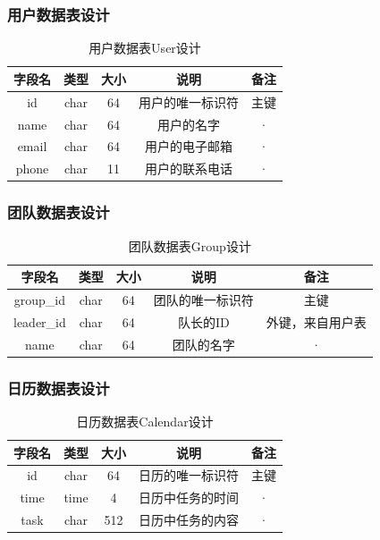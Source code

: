 \subsubsection{用户数据表设计}
\begin{table}[htbp]
\centering
\caption{用户数据表User设计} \label{tab:client-database}
\begin{tabular}{|c|c|c|c|c|}
    \hline
    字段名 & 类型 & 大小 & 说明 & 备注 \\
    \hline
    id & char & 64 & 用户的唯一标识符 & 主键\\
    \hline
    name & char & 64 & 用户的名字 & · \\
    \hline
    email & char  & 64 & 用户的电子邮箱 & · \\
    \hline
    phone & char & 11 & 用户的联系电话 & · \\
    \hline
\end{tabular}
\end{table}
\subsubsection{团队数据表设计}
\begin{table}[htbp]
\centering
\caption{团队数据表Group设计} \label{tab:order-database}
\begin{tabular}{|c|c|c|c|c|}
    \hline
    字段名 & 类型 & 大小 & 说明 & 备注 \\
    \hline
    group\_id & char & 64 & 团队的唯一标识符 & 主键\\
    \hline
    leader\_id & char & 64 & 队长的ID & 外键，来自用户表 \\
    \hline
    name & char & 64 & 团队的名字 & · \\
    \hline
\end{tabular}
\end{table}
\subsubsection{日历数据表设计}
\begin{table}[htbp]
\centering
\caption{日历数据表Calendar设计} \label{tab:order-database}
\begin{tabular}{|c|c|c|c|c|}
    \hline
    字段名 & 类型 & 大小 & 说明 & 备注 \\
    \hline
    id & char & 64 & 日历的唯一标识符 & 主键\\
    \hline
    time & time & 4 & 日历中任务的时间 & · \\
    \hline
    task & char & 512 & 日历中任务的内容 & · \\
    \hline
\end{tabular}
\end{table}
